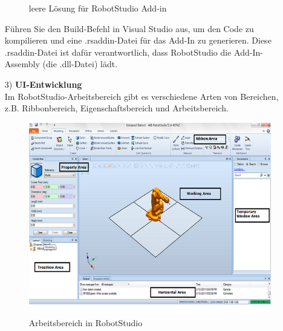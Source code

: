 \documentclass[14pt,a4paper,titlepage]{article}
\begin{document}
\begin{itemize}
\begin{figure}[h!]
					\caption{leere Lösung für RobotStudio Add-in}
					\end{figure}
				\bigbreak
				Führen Sie den Build-Befehl in Visual Studio aus, um den Code zu kompilieren und eine .rsaddin-Datei für das Add-In zu generieren. Diese .rsaddin-Datei ist dafür verantwortlich, dass RobotStudio die Add-In-Assembly (die .dll-Datei) lädt.
				\item[3)]
				\textbf{UI-Entwicklung}
				\\
				Im RobotStudio-Arbeitsbereich gibt es verschiedene Arten von Bereichen, z.B. Ribbonbereich, Eigenschaftsbereich und Arbeitsbereich.
					\begin{figure}[h!]
						\centering
						\includegraphics[width=0.8\linewidth]{workarea.png}
						\caption{Arbeitsbereich in RobotStudio}
					\end{figure}
				

\end{itemize}
\end{document}
